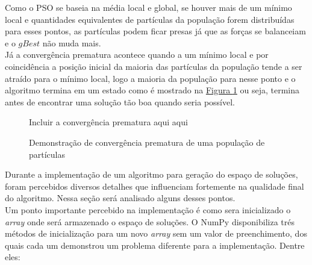 Como o PSO se baseia na média local e global, se houver mais de um mínimo local e quantidades equivalentes de partículas da população forem distribuídas para esses pontos, as partículas podem ficar presas já que as forças se balanceiam e o $gBest$ não muda mais.\\
Já a convergência prematura acontece quando a um mínimo local e por coincidência a posição inicial da maioria das partículas da população tende a ser atraído para o mínimo local, logo a maioria da população para nesse ponto e o algoritmo termina em um estado como é mostrado na 
\hyperref[fig:convergencia-prematura]{Figura \ref{fig:convergencia-prematura}} 
ou seja, termina antes de encontrar uma solução tão boa quando seria possível.\\
\begin{figure}[ht]
    \centering
    \small{Incluir a convergência prematura aqui aqui}
    \caption{Demonstração de convergência prematura de uma população de partículas}
    \label{fig:convergencia-prematura}
\end{figure}
\indent Durante a implementação de um algoritmo para geração do espaço de soluções, foram percebidos diversos detalhes que influenciam fortemente na qualidade final do algoritmo. Nessa seção será analisado alguns desses pontos.\\
\indent Um ponto importante percebido na implementação é como sera inicializado o \textit{array} onde será armazenado o espaço de soluções.
\indent O NumPy disponibiliza trés métodos de inicialização para um novo \textit{array} sem um valor de preenchimento, dos quais cada um demonstrou um problema diferente para a implementação. Dentre eles: 
